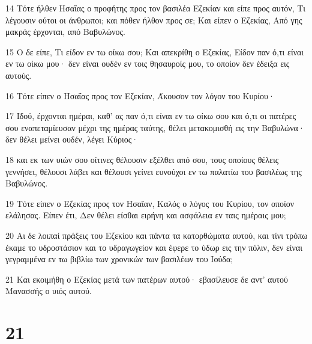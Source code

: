 \par 14 Τότε ήλθεν Ησαΐας ο προφήτης προς τον βασιλέα Εζεκίαν και είπε προς αυτόν, Τι λέγουσιν ούτοι οι άνθρωποι; και πόθεν ήλθον προς σε; Και είπεν ο Εζεκίας, Από γης μακράς έρχονται, από Βαβυλώνος.
\par 15 Ο δε είπε, Τι είδον εν τω οίκω σου; Και απεκρίθη ο Εζεκίας, Είδον παν ό,τι είναι εν τω οίκω μου· δεν είναι ουδέν εν τοις θησαυροίς μου, το οποίον δεν έδειξα εις αυτούς.
\par 16 Τότε είπεν ο Ησαΐας προς τον Εζεκίαν, Άκουσον τον λόγον του Κυρίου·
\par 17 Ιδού, έρχονται ημέραι, καθ' ας παν ό,τι είναι εν τω οίκω σου και ό,τι οι πατέρες σου εναπεταμίευσαν μέχρι της ημέρας ταύτης, θέλει μετακομισθή εις την Βαβυλώνα· δεν θέλει μείνει ουδέν, λέγει Κύριος·
\par 18 και εκ των υιών σου οίτινες θέλουσιν εξέλθει από σου, τους οποίους θέλεις γεννήσει, θέλουσι λάβει και θέλουσι γείνει ευνούχοι εν τω παλατίω του βασιλέως της Βαβυλώνος.
\par 19 Τότε είπεν ο Εζεκίας προς τον Ησαΐαν, Καλός ο λόγος του Κυρίου, τον οποίον ελάλησας. Είπεν έτι, Δεν θέλει είσθαι ειρήνη και ασφάλεια εν ταις ημέραις μου;
\par 20 Αι δε λοιπαί πράξεις του Εζεκίου και πάντα τα κατορθώματα αυτού, και τίνι τρόπω έκαμε το υδροστάσιον και το υδραγωγείον και έφερε το ύδωρ εις την πόλιν, δεν είναι γεγραμμένα εν τω βιβλίω των χρονικών των βασιλέων του Ιούδα;
\par 21 Και εκοιμήθη ο Εζεκίας μετά των πατέρων αυτού· εβασίλευσε δε αντ' αυτού Μανασσής ο υιός αυτού.

\chapter{21}

